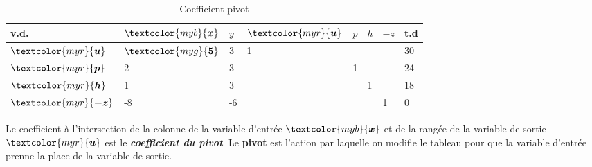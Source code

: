 \documentclass{report}
\begin{document}
\begin{multicols*}{2}
        \begin{table}[H]
                \begin{center}
                    \renewcommand{\arraystretch}{1.5}
                    \selectfont
                    \footnotesize
                        \begin{tabular}{|l|l l l l l |l|l|}
                        \arrayrulecolor{blue}
                        \hline
                        v.d. & $\textcolor{myb}{\boldsymbol{x}}$
                             & $y$ & $\textcolor{myr}{\boldsymbol{u}}$ & $p$ & $h$ & $-z$ & t.d 
                        \\
                        \hline
                        \arrayrulecolor{black}
                        $\textcolor{myr}{\boldsymbol{u}} 
                        $     & \cellcolor{myg!40} $\textcolor{myg}{\boldsymbol{5}}$ 
                                & 3
                                & 1
                                & 
                                & &  &  30
                        \\
                        $\textcolor{myr}{\boldsymbol{p}} $     
                               & 2
                               & 3
                               & & 1
                               & & & 24 
                        \\
                        $\textcolor{myr}{\boldsymbol{h}} $     
                               & 1
                               & 3 
                               &  & 
                               &  1
                               & & 18 
                        \\ 
                        \hline
                        $\textcolor{myr}{\boldsymbol{-z}}$ 
                               & -8
                                & -6
                                & 
                                & 
                                & 
                                & 1 & 0 
                        \\
                        \hline 



                        \end{tabular}
                \end{center}
        \caption{Coefficient pivot}
        \end{table}

    Le coefficient à l'intersection de la colonne de la variable d'entrée 
    $\textcolor{myb}{\boldsymbol{x}}$ et de la rangée de la variable de sortie 
    $\textcolor{myr}{\boldsymbol{u}}$ est le \textcolor{myg}{\textit{\textbf{coefficient du pivot}}}. 
    Le \textbf{pivot} est l'action par laquelle on modifie le tableau pour que la variable 
    d'entrée prenne la place de la variable de sortie. 



\end{multicols*}
\end{document}
